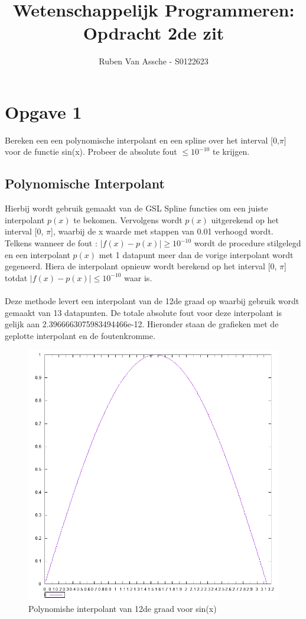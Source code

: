 \documentclass[10pt,a4paper]{article}
\author{Ruben Van Assche - S0122623}
\title{Wetenschappelijk Programmeren: Opdracht 2de zit}
\begin{document}
\maketitle
\section{Opgave 1}
Bereken een een polynomische interpolant en een spline over het interval [0,$ \pi$] voor de functie sin(x). Probeer de absolute fout $\leq 10^{-10}$ te krijgen.
\subsection{Polynomische Interpolant}
Hierbij wordt gebruik gemaakt van de GSL Spline functies om een juiste interpolant $p(x)$ te bekomen. Vervolgens wordt $p(x)$ uitgerekend op het interval [0, $\pi$], waarbij de x waarde met stappen van 0.01 verhoogd wordt. Telkens wanneer de fout : $\left | f(x) - p(x)  \right | \geq 10^{-10}$ wordt de procedure stilgelegd en een interpolant $p(x)$ met 1  datapunt meer dan de vorige interpolant wordt gegeneerd. Hiera de interpolant opnieuw wordt berekend op het interval  [0, $\pi$] totdat $\left | f(x) - p(x)  \right | \leq 10^{-10}$ waar is.
\\
\\
Deze methode levert een interpolant van de 12de graad op waarbij gebruik wordt gemaakt van 13 datapunten. De totale absolute fout voor deze interpolant is gelijk aan 2.3966663075983494466e-12. Hieronder staan de grafieken met de geplotte interpolant en de foutenkromme.
\begin{figure}[H]
\centering
\includegraphics[scale=0.3]{../Onegraphs/Polynomial-Interpolated.png}
\caption{Polynomishe interpolant van 12de graad voor sin(x)}
\end{figure}
\end{document}
